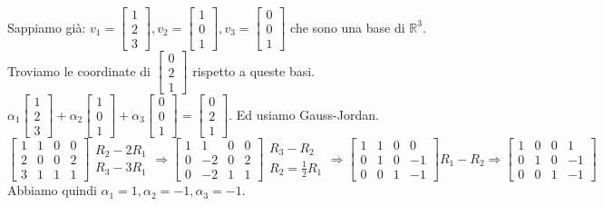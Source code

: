 \begin{example}
Sappiamo già: $v_1 = \begin{bmatrix}1\\2\\3\end{bmatrix}, v_2 = \begin{bmatrix}1\\0\\1\end{bmatrix}, v_3 = \begin{bmatrix}0\\0\\1\end{bmatrix}$ che sono una base di $\mathbb{R}^3$.
Troviamo le coordinate di $\begin{bmatrix}0\\2\\1\end{bmatrix}$ rispetto a queste basi.
$\alpha_1\begin{bmatrix}1\\2\\3\end{bmatrix} + \alpha_2\begin{bmatrix}1\\0\\1\end{bmatrix} + \alpha_3\begin{bmatrix}0\\0\\1\end{bmatrix} = \begin{bmatrix}0\\2\\1\end{bmatrix}$. Ed usiamo Gauss-Jordan.
\[
\begin{bmatrix}
1 & 1 & 0 & 0\\
2 & 0 & 0 & 2\\
3 & 1 & 1 & 1
\end{bmatrix}
\begin{array}{l}
    R_2 - 2R_1\\
    R_3 - 3R_1
\end{array}
\Rightarrow
\begin{bmatrix}
1 & 1 & 0 & 0\\
0 & -2 & 0 & 2\\
0 & -2 & 1 & 1
\end{bmatrix}
\begin{array}{l}
    R_3 - R_2\\
    R_2 = \frac{1}{2}R_1
\end{array}
\Rightarrow
\begin{bmatrix}
1 & 1 & 0 & 0\\
0 & 1 & 0 & -1\\
0 & 0 & 1 & -1
\end{bmatrix}
R_1 - R_2
\Rightarrow
\begin{bmatrix}
1 & 0 & 0 & 1\\
0 & 1 & 0 & -1\\
0 & 0 & 1 & -1
\end{bmatrix}
\]
Abbiamo quindi $\alpha_1 = 1, \alpha_2 = -1, \alpha_3 = -1$.
\end{example}

